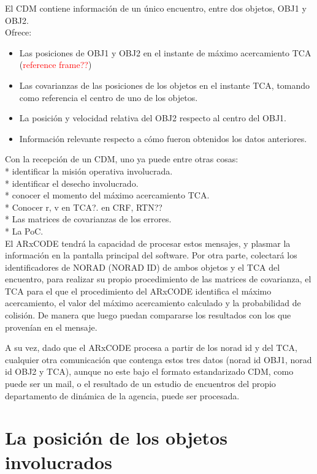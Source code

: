 El CDM contiene informaci\'on de un \'unico encuentro, entre dos objetos, OBJ1 y OBJ2.\\
Ofrece:\\
\begin{itemize}
 \item Las posiciones de OBJ1 y OBJ2 en el instante de m\'aximo acercamiento TCA (\textcolor{red}{reference frame??})
 \item Las covarianzas de las posiciones de los objetos en el instante TCA, tomando como referencia el centro de uno de los objetos.
 \item La posici\'on y velocidad relativa del OBJ2 respecto al centro del OBJ1.
 \item Informaci\'on relevante respecto a c\'omo fueron obtenidos los datos anteriores.
\end{itemize}

Con la recepci\'on de un CDM, uno ya puede entre otras cosas:\\
* identificar la misi\'on operativa involucrada.\\
* identificar el desecho involucrado.\\
* conocer el momento del m\'aximo acercamiento TCA.\\
* Conocer r, v en TCA?. en CRF, RTN??\\
* Las matrices de covarianzas de los errores.\\
* La PoC.\\

El ARxCODE tendr\'a la capacidad de procesar estos mensajes, y plasmar la informaci\'on en la pantalla principal del software. Por otra parte, colectar\'a los identificadores de NORAD (NORAD ID) de ambos objetos y el TCA del encuentro, para realizar su propio procedimiento de las matrices de covarianza, el TCA para el que el procedimiento del ARxCODE identifica el m\'aximo acercamiento, el valor del m\'aximo acercamiento calculado y la probabilidad de colisi\'on. De manera que luego puedan compararse los resultados con los que proven\'ian en el mensaje.

A su vez, dado que el ARxCODE procesa a partir de los norad id y del TCA, cualquier otra comunicaci\'on que contenga estos tres datos (norad id OBJ1, norad id OBJ2 y TCA), aunque no este bajo el formato estandarizado CDM, como puede ser un mail, o el resultado de un estudio de encuentros del propio departamento de din\'amica de la agencia, puede ser procesada.


\section{La posici\'on de los objetos involucrados}{\label{sec:posMision}}

